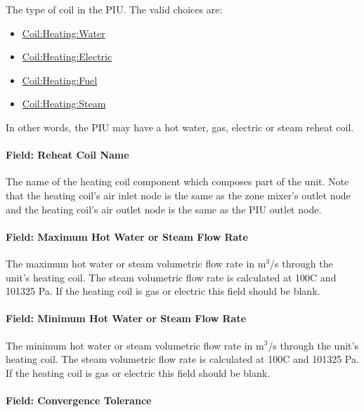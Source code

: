 The type of coil in the PIU. The valid choices are:

\begin{itemize}
\item
  \hyperref[coilheatingwater]{Coil:Heating:Water}
\item
  \hyperref[coilheatingelectric]{Coil:Heating:Electric}
\item
  \hyperref[coilheatinggas-000]{Coil:Heating:Fuel}
\item
  \hyperref[coilheatingsteam]{Coil:Heating:Steam}
\end{itemize}

In other words, the PIU may have a hot water, gas, electric or steam reheat coil.

\paragraph{Field: Reheat Coil Name}\label{field-reheat-coil-name-4}

The name of the heating coil component which composes part of the unit. Note that the heating coil's air inlet node is the same as the zone mixer's outlet node and the heating coil's air outlet node is the same as the PIU outlet node.

\paragraph{Field: Maximum Hot Water or Steam Flow Rate}\label{field-maximum-hot-water-or-steam-flow-rate-5}

The maximum hot water or steam volumetric flow rate in m\(^{3}\)/s through the unit's heating coil. The steam volumetric flow rate is calculated at 100C and 101325 Pa. If the heating coil is gas or electric this field should be blank.

\paragraph{Field: Minimum Hot Water or Steam Flow Rate}\label{field-minimum-hot-water-or-steam-flow-rate-5}

The minimum hot water or steam volumetric flow rate in m\(^{3}\)/s through the unit's heating coil. The steam volumetric flow rate is calculated at 100C and 101325 Pa. If the heating coil is gas or electric this field should be blank.

\paragraph{Field: Convergence Tolerance}\label{field-convergence-tolerance-4}

